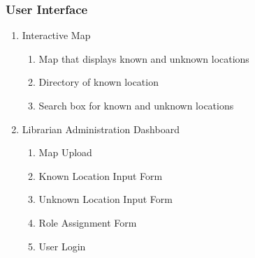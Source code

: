 \documentclass[letterpaper,10pt,titlepage, onecolumn, compsoc]{IEEEtran}
\begin{document}
\subsubsection{User Interface}
\begin{enumerate}
	\item Interactive Map
    \begin{enumerate}
    	\item Map that displays known and unknown locations
        \item Directory of known location
        \item Search box for known and unknown locations
    \end{enumerate}
	\item Librarian Administration Dashboard
    \begin{enumerate}
    	\item Map Upload
        \item Known Location Input Form
        \item Unknown Location Input Form
        \item Role Assignment Form
        \item User Login
    \end{enumerate}
\end{enumerate}





\end{document}
